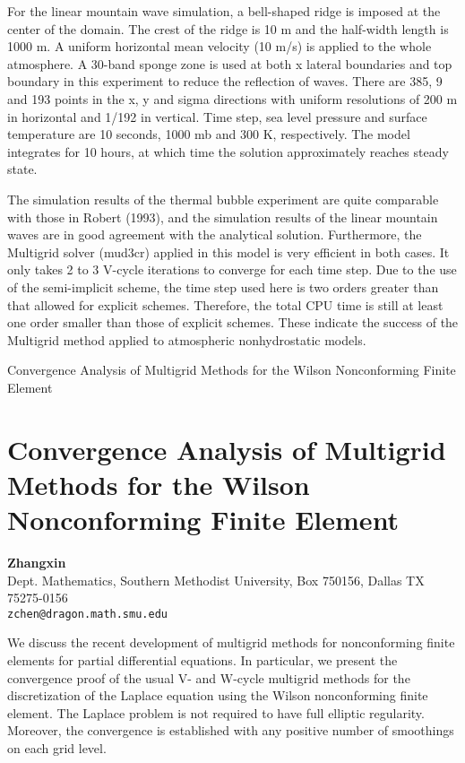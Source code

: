 \documentclass[11pt]{article}
\newcommand{\nextab}[4]{
	\section{#2}
	{\bf #1} \\ \nopagebreak
	{#3} \\ \nopagebreak
	{\tt #4} \nopagebreak
	}
\begin{document}
For the linear mountain wave simulation, a bell-shaped ridge is imposed
at the center of the domain. The crest of the ridge is 10 m and the
half-width length is 1000 m. A uniform horizontal mean velocity
(10 m/s) is applied to the whole atmosphere. A 30-band sponge zone is
used at both x lateral boundaries and top boundary in this experiment
to reduce the reflection of waves.  There are 385, 9 and 193 points
in the x, y and sigma directions with uniform resolutions of 200 m
in horizontal and 1/192 in vertical. Time step, sea level pressure
and surface temperature are 10 seconds, 1000 mb and 300 K, respectively.
The model integrates for 10 hours, at which time the solution
approximately reaches steady state.

The simulation results of the thermal bubble experiment are quite
comparable with those in Robert (1993), and the simulation results of
the linear mountain waves are in good agreement with the analytical
solution.  Furthermore, the Multigrid solver (mud3cr) applied in this
model is very efficient in both cases.  It only takes 2 to 3 V-cycle
iterations to converge for each time step.  Due to the use of the
semi-implicit scheme, the time step used here is two orders greater
than that allowed for explicit schemes.  Therefore, the total CPU time
is still at least one order smaller than those of explicit schemes.
These indicate the success of the Multigrid method applied to
atmospheric nonhydrostatic models.


Convergence Analysis of Multigrid Methods for
the Wilson Nonconforming Finite Element

\nextab{Zhangxin}
	{Convergence Analysis of Multigrid Methods for
	the Wilson Nonconforming Finite Element}
	{Dept. Mathematics, Southern Methodist University,
		Box 750156, Dallas TX 75275-0156}
	{zchen@dragon.math.smu.edu}

We discuss the recent development of multigrid methods
for nonconforming finite elements for partial differential equations.
In particular, we present the convergence proof of the usual
V- and W-cycle multigrid methods for the discretization of the Laplace
equation using the Wilson nonconforming
finite element. The Laplace problem is not required
to have full elliptic regularity. Moreover,
the convergence is established with any positive number
of smoothings on each grid level.

\end{document}
